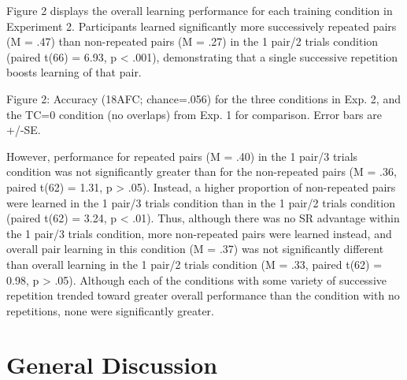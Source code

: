 \documentclass[man,floatsintext]{apa6}
\begin{document}
Figure 2 displays the overall learning performance for each training condition in Experiment 2. Participants learned significantly more successively repeated pairs (M = .47) than non-repeated pairs (M = .27) in the 1 pair/2 trials condition (paired t(66) = 6.93, p \textless{} .001), demonstrating that a single successive repetition boosts learning of that pair.

Figure 2: Accuracy (18AFC; chance=.056) for the three conditions in Exp. 2, and the TC=0 condition (no overlaps) from Exp. 1 for comparison. Error bars are +/-SE.

However, performance for repeated pairs (M = .40) in the 1 pair/3 trials condition was not significantly greater than for the non-repeated pairs (M = .36, paired t(62) = 1.31, p \textgreater{} .05). Instead, a higher proportion of non-repeated pairs were learned in the 1 pair/3 trials condition than in the 1 pair/2 trials condition (paired t(62) = 3.24, p \textless{} .01). Thus, although there was no SR advantage within the 1 pair/3 trials condition, more non-repeated pairs were learned instead, and overall pair learning in this condition (M = .37) was not significantly different than overall learning in the 1 pair/2 trials condition (M = .33, paired t(62) = 0.98, p \textgreater{} .05). Although each of the conditions with some variety of successive repetition trended toward greater overall performance than the condition with no repetitions, none were significantly greater.

\hypertarget{general-discussion}{%
\section{General Discussion}\label{general-discussion}}
\end{document}
